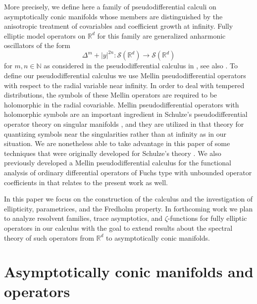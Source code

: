 \documentclass[reqno]{amsart}
\numberwithin{equation}{section}
\theoremstyle{definition}
\def\N{\mathbb N}
\def\R{\mathbb R}
\def\S{\mathscr S}
\begin{document}
More precisely, we define here a family of pseudodifferential calculi on asymptotically conic manifolds whose members are distinguished by the anisotropic treatment of covariables and coefficient growth at infinity. Fully elliptic model operators on $\R^d$ for this family are generalized anharmonic oscillators of the form
$$
\Delta^m + |y|^{2n} : \S(\R^d) \to \S(\R^d)
$$
for $m,n \in \N$ as considered in the pseudodifferential calculus in \cite{ChatzakouDelgadoRuzhansky,ChatzakouDelgadoRuzhansky2}, see also \cite{NicolaRodino}.
To define our pseudodifferential calculus we use Mellin pseudodifferential operators with respect to the radial variable near infinity. In order to deal with tempered distributions, the symbols of these Mellin operators are required to be holomorphic in the radial covariable. Mellin pseudodifferential operators with holomorphic symbols are an important ingredient in Schulze's pseudodifferential operator theory on singular manifolds \cite{SchuNH}, and they are utilized in that theory for quantizing symbols near the singularities rather than at infinity as in our situation. We are nonetheless able to take advantage in this paper of some techniques that were originally developed for Schulze's theory \cite{GilSchulzeSeiler0,GilSchulzeSeiler,SchuNH}. We also previously developed a Mellin pseudodifferential calculus for the functional analysis of ordinary differential operators of Fuchs type with unbounded operator coefficients in \cite{KrainerIndicial} that relates to the present work as well.

In this paper we focus on the construction of the calculus and the investigation of ellipticity, parametrices, and the Fredholm property. In forthcoming work we plan to analyze resolvent families, trace asymptotics, and $\zeta$-functions for fully elliptic operators in our calculus with the goal to extend results about the spectral theory of such operators \cite{HelfferAst,NicolaRodino,Parmeggiani} from $\R^d$ to asymptotically conic manifolds.


\section{Asymptotically conic manifolds and operators}\label{ManEnds}
\end{document}
